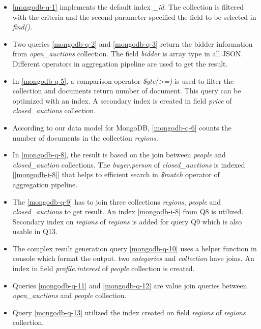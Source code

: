\begin{itemize}
\item \ref{mongodb-q-1} implements the default index \textit{\_id}. The collection is filtered with the criteria and the second parameter specified the field to be selected in \textit{find()}. 

\item Two queries \ref{mongodb-q-2} and \ref{mongodb-q-3}  return the bidder information from \textit{open\_auctions} collection.  The field \textit{bidder} is array type in all JSON. Different operators in aggregation pipeline are used to get the result.

\item In \ref{mongodb-q-5}, a comparison operator \textit{\$gte(>=)} is used to filter the collection and documents return number of document. This query can be optimized with an index. A secondary index is created in field \textit{price} of \textit{closed\_auctions} collection. 

\item According to our data model for MongoDB, \ref{mongodb-q-6} counts the number of documents in the collection \textit{regions}.

\item In \ref{mongodb-q-8}, the result is based on the join  between  \textit{people} and \textit{closed\_auction} collections. The \textit{buyer.person} of \textit{closed\_auctions} is indexed [\ref{mongodb-i-8}] that helps to efficient search in \textit{\$match} operator of aggregation pipeline.
 \item 
The  \ref{mongodb-q-9} has to join  three collections \textit{regions}, \textit{people} and \textit{closed\_auctions} to get result.  An index \ref{mongodb-i-8} from Q8 is utilized. Secondary index on \textit{regions} of \textit{regions}  is added for query Q9 which is also usable in Q13. 

\item The complex result generation query \ref{mongodb-q-10} uses a helper function in console which format the output. two \textit{categories} and \textit{collection}  have joins. An index  
in field \textit{profile.interest} of \textit{people} collection is created. 

\item Queries \ref{mongodb-q-11} and \ref{mongodb-q-12} are value join queries between \textit{open\_auctions} and \textit{people} collection. 

\item Query \ref{mongodb-q-13} utilized the index created on field \textit{regions} of \textit{regions} collection. 


\end{itemize}
